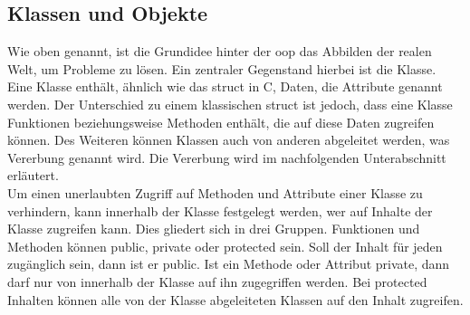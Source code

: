 \subsection{Klassen und Objekte}
Wie oben genannt, ist die Grundidee hinter der \ac{oop} das Abbilden der realen Welt, um Probleme zu lösen. Ein zentraler Gegenstand hierbei ist die Klasse. Eine Klasse enthält, ähnlich wie das \glqq struct\grqq{} in C, Daten, die Attribute genannt werden. Der Unterschied zu einem klassischen  \glqq struct\grqq{} ist jedoch, dass eine Klasse Funktionen beziehungsweise Methoden enthält, die auf diese Daten zugreifen können. Des Weiteren können  Klassen auch von anderen abgeleitet werden, was Vererbung genannt wird. Die Vererbung wird im nachfolgenden Unterabschnitt erläutert. \\
Um einen unerlaubten Zugriff auf Methoden und Attribute einer Klasse zu verhindern, kann innerhalb der Klasse festgelegt werden, wer auf Inhalte der Klasse zugreifen kann. Dies gliedert sich in drei Gruppen. Funktionen und Methoden können \glqq public\grqq{},  \glqq private\grqq{} oder \glqq protected\grqq{} sein. Soll der Inhalt für jeden zugänglich sein, dann ist er \glqq public\grqq{}. Ist ein Methode oder Attribut \glqq private\grqq{}, dann darf nur von innerhalb der Klasse auf ihn zugegriffen werden. Bei \glqq protected\grqq{} Inhalten können alle von der Klasse abgeleiteten Klassen auf den Inhalt zugreifen.

